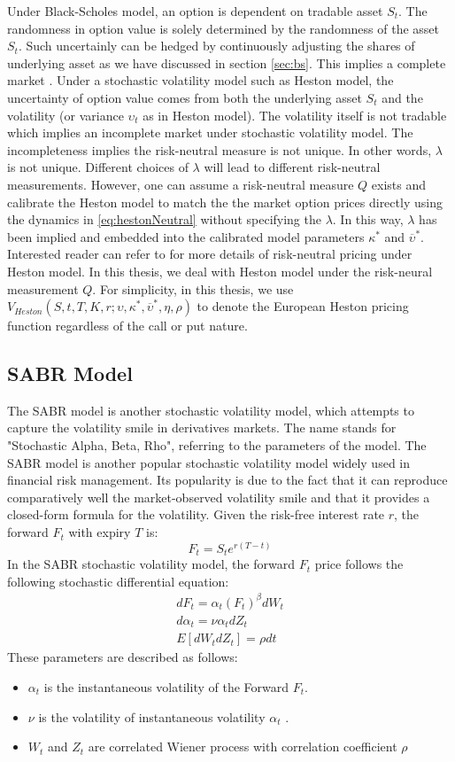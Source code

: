 \documentclass[letterpaper,12pt,titlepage,oneside,final]{book}
\numberwithin{equation}{section}
\theoremstyle{definition}
\begin{document}
Under Black-Scholes model, an option is dependent on tradable asset $S_t$. The randomness in option value is solely determined by the randomness of the asset $S_t$. Such uncertainly can be hedged by continuously adjusting the shares of underlying asset as we have discussed in  section \ref{sec:bs}. This implies a complete market \cite{shreve2004stochastic}.
Under a stochastic volatility model such as Heston model, the uncertainty of option value comes from both the underlying asset $S_t$ and the volatility (or variance $\upsilon_t$ as in Heston model). The volatility itself is not tradable which implies an incomplete market under stochastic volatility model. The incompleteness implies the risk-neutral measure is not unique. In other words, $\lambda$ is not unique. Different choices of $\lambda$ will lead to different risk-neutral measurements. However, one can assume a risk-neutral measure $Q$ exists and calibrate the Heston model to match the the market option prices directly using the dynamics in \eqref{eq:hestonNeutral} without specifying the $\lambda$. In this way, $\lambda$ has been implied and embedded into the calibrated model parameters $\kappa^*$ and $\overline{\upsilon}^*$. Interested reader can refer to \cite{heston1993closed,gatheral2011volatility} for more details of risk-neutral pricing under Heston model. In this thesis, we deal with Heston model under the risk-neural measurement $Q$. For simplicity, in this thesis,  we use $V_{Heston}(S,t,T,K,r;\upsilon,\kappa^*,\overline{\upsilon}^*,\eta,\rho)$ to denote the European Heston pricing function regardless of the call or put nature.
\subsection{SABR Model}
The SABR model  \cite{hagan2002managing} is another stochastic volatility model, which attempts to capture the volatility smile in derivatives markets. The name stands for "Stochastic Alpha, Beta, Rho", referring to the parameters of the model.  The SABR model is another popular stochastic volatility model widely used in financial risk management. Its popularity is due to the fact that it can reproduce comparatively well the market-observed volatility smile and that it provides a closed-form
formula for the volatility. 
Given the risk-free interest rate $r$, the forward $F_t$ with expiry $T$ is: 
\[
F_t=S_t e^{r (T-t)}
\]
In the SABR stochastic volatility model, the  forward $F_t$ price follows the following stochastic differential equation:
\[
\begin{split}
dF_t=\alpha_t (F_t)^{\beta}dW_t\\
d\alpha_t=\nu \alpha_t dZ_t\\
E[dW_tdZ_t]=\rho dt
\end{split}
\]
These parameters are described as follows:
\begin{itemize}
	\item $\alpha_t$ is the instantaneous  volatility of the Forward $F_t$.
	\item $\nu$ is the   volatility of  instantaneous  volatility $\alpha_t$  .
	\item $W_t$ and $Z_t$ are correlated Wiener process with correlation coefficient $\rho$
\end{itemize}
\end{document}
